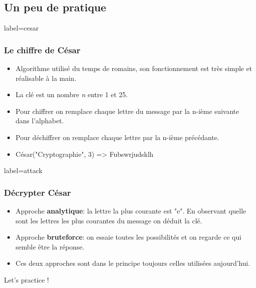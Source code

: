 \documentclass{beamer}
\begin{document}
    \subsection{Un peu de pratique}
        \begin{frame}{label=cesar}
            \frametitle{Le chiffre de César}
            \begin{center}
                \begin{itemize}
                    \item Algorithme utilisé du temps de romains, son fonctionnement est très simple et réalisable à la main.
                    \pause
                    \item La clé est un nombre \textit{n} entre 1 et 25.
                    \pause
                    \item Pour chiffrer on remplace chaque lettre du message par la n-ième suivante dans l'alphabet.
                    \pause
                    \item Pour déchiffrer on remplace chaque lettre par la n-ième précédante.
                    \pause
                    \item César("Cryptographie", 3) \pause => Fubswrjudsklh
                \end{itemize}
            \end{center}
        \end{frame}
        \begin{frame}{label=attack}
            \frametitle{Décrypter César}
            \begin{center}
                \begin{itemize}
                    \item Approche \textbf{analytique}: la lettre la plus courante est "e". En observant quelle sont les lettres les plus courantes du message on déduit la clé.
                    \item Approche \textbf{bruteforce}: on essaie toutes les possibilités et on regarde ce qui semble être la réponse.
                    \item Ces deux approches sont dans le principe toujours celles utilisées aujourd'hui.
                \end{itemize}
                Let's practice !
            \end{center}
        \end{frame}
\end{document}
